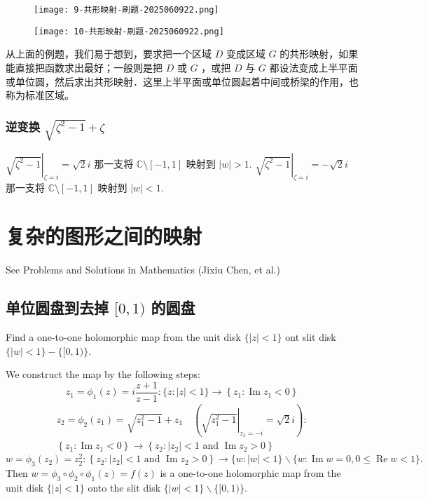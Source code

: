\begin{figure}[H]
\centering
\texttt{[image: 9-共形映射-刷题-2025060922.png]}
\label{}
\end{figure}
\begin{figure}[H]
\centering
\texttt{[image: 10-共形映射-刷题-2025060922.png]}
\label{}
\end{figure}

\begin{remark}
从上面的例题，我们易于想到，要求把一个区域 $D$ 变成区域 $G$ 的共形映射，如果能直接把函数求出最好；一般则是把 $D$ 或 $G$ ，或把 $D$ 与 $G$ 都设法变成上半平面或单位圆，然后求出共形映射．这里上半平面或单位圆起着中间或桥梁的作用，也称为标准区域。
\end{remark}
\subsubsection{逆变换 \texorpdfstring{$\sqrt{ \zeta^{2}-1 }+\zeta$}{sqrt zeta^2-1 +zeta}}

$\left.\sqrt{ \zeta^{2}-1 }\right|_{\zeta=i}=\sqrt{ 2 }i$ 那一支将 $\mathbb{C}\setminus[-1,1]$ 映射到 $\lvert w \rvert>1$. $\left.\sqrt{ \zeta^{2}-1 }\right|_{\zeta=i}=-\sqrt{ 2 }i$ 那一支将 $\mathbb{C}\setminus[-1,1]$ 映射到 $\lvert w \rvert<1$.

\section{复杂的图形之间的映射}

See Problems and Solutions in Mathematics (Jixiu Chen, et al.)

\subsection{单位圆盘到去掉 \texorpdfstring{$[0,1)$}{[0,1)} 的圆盘}

\begin{exercise}
Find a one-to-one holomorphic map from the unit disk $\{|z|<1\}$ ont slit disk $\{|w|<1\}-\{[0,1)\}$.
\end{exercise}
We construct the map by the following steps:
\[
z_1=  \phi_1(z)=i \frac{z+1}{z-1}:\{z:|z|<1\} \rightarrow\left\{z_1: \operatorname{Im} z_1<0\right\}
\]
\[
\begin{aligned}
z_2=  \phi_2\left(z_1\right)=\sqrt{z_1^2-1}+z_1 \quad\left(\left.\sqrt{z_1^2-1}\right|_{z_1=-i}=\sqrt{2} i\right):\\
\left\{z_1: \operatorname{Im} z_1<0\right\} \rightarrow\left\{z_2:\left|z_2\right|<1 \text { and } \operatorname{Im} z_2>0\right\}
\end{aligned}
\]
\[
w=  \phi_3\left(z_2\right)=z_2^2:\left\{z_2:\left|z_2\right|<1 \text { and } \operatorname{Im} z_2>0\right\} \rightarrow
\{w:|w|<1\} \backslash\{w: \operatorname{Im} w=0,0 \leq \operatorname{Re} w<1\} .
\]
Then $w=\phi_3 \circ \phi_2 \circ \phi_1(z)=f(z)$ is a one-to-one holomorphic map from the unit disk $\{|z|<1\}$ onto the slit disk $\{|w|<1\} \backslash\{[0,1)\}$.

